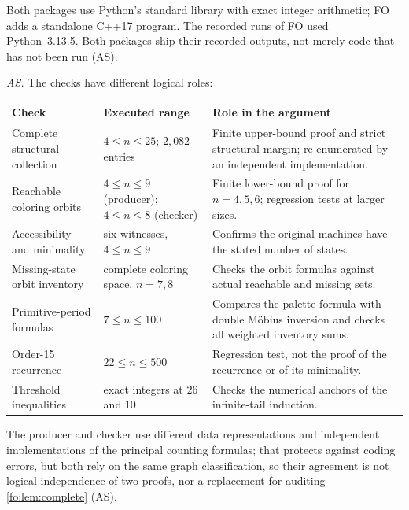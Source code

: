 \documentclass[11pt,a4paper]{article}
\numberwithin{equation}{section}
\theoremstyle{definition}
\theoremstyle{remark}
\begin{document}
Both packages use Python's standard library with exact integer arithmetic;
FO adds a standalone C++17 program. The recorded runs of FO used
Python~3.13.5. Both packages ship their recorded outputs, not merely code that
has not been run (AS).

\emph{AS.} The checks have different logical roles:
\begin{center}
\small
\begin{tabular}{@{}>{\raggedright}p{}>{\raggedright}p{}>{\raggedright\arraybackslash}p{}@{}}
\toprule
Check & Executed range & Role in the argument\\
\midrule
Complete structural collection & $4\le n\le25$; $2{,}082$ entries & Finite
upper-bound proof and strict structural margin; re-enumerated by an
independent implementation.\\[2pt]
Reachable coloring orbits & $4\le n\le9$ (producer); $4\le n\le8$ (checker) &
Finite lower-bound proof for $n=4,5,6$; regression tests at larger sizes.\\[2pt]
Accessibility and minimality & six witnesses, $4\le n\le9$ & Confirms the
original machines have the stated number of states.\\[2pt]
Missing-state orbit inventory & complete coloring space, $n=7,8$ & Checks the
orbit formulas against actual reachable and missing sets.\\[2pt]
Primitive-period formulas & $7\le n\le100$ & Compares the palette formula with
double M\"obius inversion and checks all weighted inventory sums.\\[2pt]
Order-15 recurrence & $22\le n\le500$ & Regression test, not the proof of the
recurrence or of its minimality.\\[2pt]
Threshold inequalities & exact integers at $26$ and $10$ & Checks the numerical
anchors of the infinite-tail induction.\\
\bottomrule
\end{tabular}
\end{center}
The producer and checker use different data representations and independent
implementations of the principal counting formulas; that protects against
coding errors, but both rely on the same graph classification, so their
agreement is not logical independence of two proofs, nor a replacement for
auditing \cref{fo:lem:complete} (AS).
\end{document}
